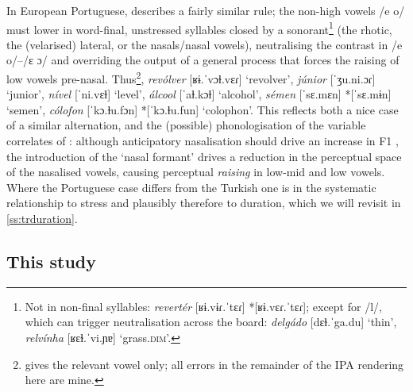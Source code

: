 In European Portuguese, \citet[p.~86--88]{Vigario2002} describes a fairly similar rule; the non-high vowels /e o/ must lower in word-final, unstressed syllables closed by a sonorant\footnote{Not in non-final syllables: \textit{revertér} [ʁɨ.vɨɾ.ˈtɛɾ] *[ʁɨ.vɛɾ.ˈtɛɾ]; except for /l/, which can trigger neutralisation across the board: \textit{delgádo} [dɛɫ.ˈga.du] `thin', \textit{relvínha} [ʁɛɫ.ˈvi.ɲɐ] `grass.\textsc{\footnotesize dim}'.} (the rhotic, the (velarised) lateral, or the nasals/nasal vowels), neutralising the contrast in /e o/–/ɛ ɔ/ and overriding the output of a general process that forces the raising of low vowels pre-nasal. Thus\footnote{\citet{Vigario2002} gives the relevant vowel only; all errors in the remainder of the IPA rendering here are mine.}, \textit{revólver} [ʁɨ.ˈvɔɫ.vɛɾ] `revolver', \textit{júnior} [ˈʒu.ni.ɔɾ] `junior', \textit{nível} [ˈni.vɛɫ] `level', \textit{álcool} [ˈaɫ.kɔɫ] `alcohol', \textit{sémen} [ˈsɛ.mɛn] *[ˈsɛ.mɨn] `semen', \textit{cólofon} [ˈkɔ.ɫu.fɔn] *[ˈkɔ.ɫu.fun] `colophon'. This reflects both a nice case of a similar alternation, and the (possible) phonologisation of the variable correlates of :  although anticipatory nasalisation should drive an increase in F1 \citep{Krakow1988}, the introduction of the `nasal formant' \citep{Beddor1993,Beddor1986} drives a reduction in the perceptual space of the nasalised vowels, causing perceptual \textit{raising} in low-mid and low vowels. Where the Portuguese case differs from the Turkish one is in the systematic relationship to stress and plausibly therefore to duration, which we will revisit in \cref{ss:trduration}.
%

\subsection{This study}\label{ss:trstudy}

